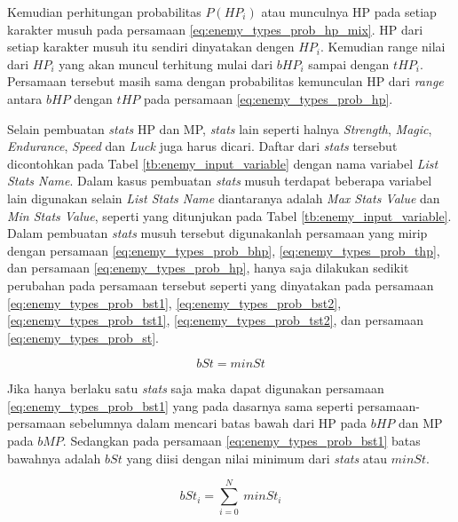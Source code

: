 Kemudian perhitungan probabilitas $P(HP_{i})$ atau munculnya HP pada setiap karakter musuh pada persamaan \ref{eq:enemy_types_prob_hp_mix}. HP dari setiap karakter musuh itu sendiri dinyatakan dengen $HP_{i}$. Kemudian range nilai dari $HP_{i}$ yang akan muncul terhitung mulai dari $bHP_{i}$ sampai dengan $tHP_{i}$. Persamaan tersebut masih sama dengan probabilitas kemunculan HP dari \textit{range} antara $bHP$ dengan $tHP$ pada persamaan \ref{eq:enemy_types_prob_hp}.
\vspace{1ex}

Selain pembuatan \textit{stats} HP dan MP, \textit{stats} lain seperti halnya \textit{Strength}, \textit{Magic}, \textit{Endurance}, \textit{Speed} dan \textit{Luck} juga harus dicari. Daftar dari \textit{stats} tersebut dicontohkan pada Tabel \ref{tb:enemy_input_variable} dengan nama variabel \textit{List Stats Name}. Dalam kasus pembuatan \textit{stats} musuh terdapat beberapa variabel lain digunakan selain \textit{List Stats Name} diantaranya adalah \textit{Max Stats Value} dan \textit{Min Stats Value}, seperti yang ditunjukan pada Tabel \ref{tb:enemy_input_variable}. Dalam pembuatan \textit{stats} musuh tersebut digunakanlah persamaan yang mirip dengan persamaan \ref{eq:enemy_types_prob_bhp}, \ref{eq:enemy_types_prob_thp}, dan persamaan \ref{eq:enemy_types_prob_hp}, hanya saja dilakukan sedikit perubahan pada persamaan tersebut seperti yang dinyatakan pada persamaan \ref{eq:enemy_types_prob_bst1}, \ref{eq:enemy_types_prob_bst2}, \ref{eq:enemy_types_prob_tst1}, \ref{eq:enemy_types_prob_tst2}, dan persamaan \ref{eq:enemy_types_prob_st}.

\begin{equation}\label{eq:enemy_types_prob_bst1}
bSt = minSt
\end{equation}

Jika hanya berlaku satu \textit{stats} saja maka dapat digunakan persamaan \ref{eq:enemy_types_prob_bst1} yang pada dasarnya sama seperti persamaan-persamaan sebelumnya dalam mencari batas bawah dari HP pada $bHP$ dan MP pada $bMP$. Sedangkan pada persamaan \ref{eq:enemy_types_prob_bst1} batas bawahnya adalah $bSt$ yang diisi dengan nilai minimum dari \textit{stats} atau $minSt$.

\begin{equation}\label{eq:enemy_types_prob_bst2}
bSt_{i} = \sum_{i=0}^{N}\ minSt_{i}
\end{equation}

